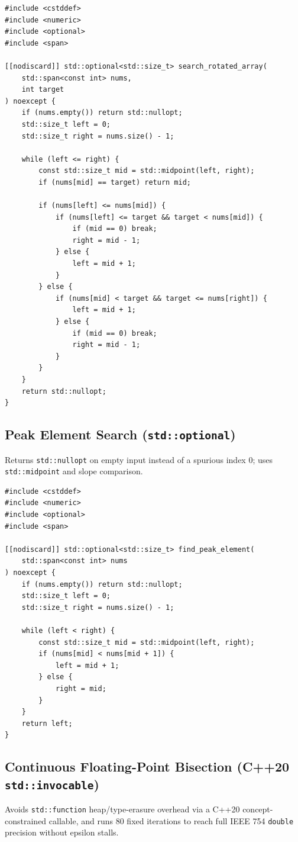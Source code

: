 \documentclass[11pt,a4paper]{article}
\theoremstyle{definition}
\begin{document}
\begin{lstlisting}[caption={Search in a cyclically rotated sorted array of unique elements}]
#include <cstddef>
#include <numeric>
#include <optional>
#include <span>

[[nodiscard]] std::optional<std::size_t> search_rotated_array(
    std::span<const int> nums,
    int target
) noexcept {
    if (nums.empty()) return std::nullopt;
    std::size_t left = 0;
    std::size_t right = nums.size() - 1;

    while (left <= right) {
        const std::size_t mid = std::midpoint(left, right);
        if (nums[mid] == target) return mid;

        if (nums[left] <= nums[mid]) {
            if (nums[left] <= target && target < nums[mid]) {
                if (mid == 0) break;
                right = mid - 1;
            } else {
                left = mid + 1;
            }
        } else {
            if (nums[mid] < target && target <= nums[right]) {
                left = mid + 1;
            } else {
                if (mid == 0) break;
                right = mid - 1;
            }
        }
    }
    return std::nullopt;
}
\end{lstlisting}

\subsection{Peak Element Search (\texorpdfstring{\texttt{std::optional}}{std::optional})}
Returns \texttt{std::nullopt} on empty input instead of a spurious index $0$; uses \texttt{std::midpoint} and slope comparison.

\begin{lstlisting}[caption={Finding any peak element in O(log N) time}]
#include <cstddef>
#include <numeric>
#include <optional>
#include <span>

[[nodiscard]] std::optional<std::size_t> find_peak_element(
    std::span<const int> nums
) noexcept {
    if (nums.empty()) return std::nullopt;
    std::size_t left = 0;
    std::size_t right = nums.size() - 1;

    while (left < right) {
        const std::size_t mid = std::midpoint(left, right);
        if (nums[mid] < nums[mid + 1]) {
            left = mid + 1;
        } else {
            right = mid;
        }
    }
    return left;
}
\end{lstlisting}

\subsection{Continuous Floating-Point Bisection (C++20 \texorpdfstring{\texttt{std::invocable}}{std::invocable})}
Avoids \texttt{std::function} heap/type-erasure overhead via a C++20 concept-constrained callable, and runs 80 fixed iterations to reach full IEEE 754 \texttt{double} precision without epsilon stalls.
\end{document}
